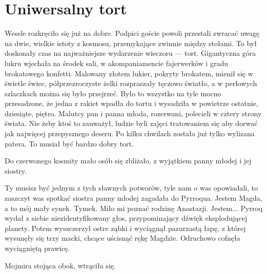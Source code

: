 \chapter{Uniwersalny tort}



Wesele rozkręciło się już na dobre. 
Podpici goście powoli przestali zwracać uwagę na dwie, wielkie istoty z kosmosu, przemykające zwinnie między stołami.
To był doskonały czas na najważniejsze wydarzenie wieczoru --- tort.
Gigantyczna góra lukru wjechała na środek sali, w akompaniamencie fajerwerków i gradu brokatowego konfetti. 
Malowany złotem lukier, pokryty brokatem, mienił się w świetle świec, półprzezroczyste żelki rozpraszały tęczowo światło, a w perłowych szlaczkach można się było przejrzeć.
Było to wszystko na tyle mocno przesadzone, że jedna z rakiet wpadła do tortu i wysadziła w powietrze ostatnie, dziesiąte, piętro.
Malutcy pan i panna młoda, rozerwani, polecieli w cztery strony świata.
Nie żeby ktoś to zauważył, ludzie byli zajęci tratowaniem się aby dorwać jak najwięcej przepysznego deseru. 
Po kilku chwilach została już tylko wylizana patera. To musiał być bardzo dobry tort.

Do czerwonego kosmity mało osób się zbliżało, z wyjątkiem panny młodej i jej siostry.

\begin{dialogue}
\ds{} Ty musisz być jednym z tych sławnych potworów, tyle nam o was opowiadali, to zaszczyt was spotkać \dm{} siostra panny młodej zagadała do Pyrroqua. \dm{}
Jestem Magda, a to mój mały synek. Tymek.
\ds{} Miło mi poznać rodzinę Anastazji. Jestem... \dm{} Pyrroq wydał z siebie niezidentyfikowany głos, przypominający dźwięk eksplodującej planety.
Potem wyszczerzył ostre ząbki i wyciągnął pazurzastą łapę, z której wysunęły się trzy macki, chcące uścisnąć rękę Magdzie. Odruchowo cofnęła wyciągniętą prawicę.
\end{dialogue}

Mojmira stojąca obok, wtrąciła się.

